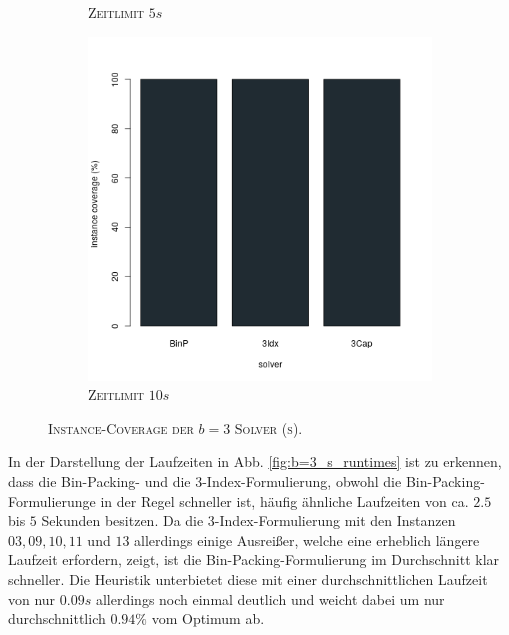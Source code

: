 \begin{figure}[H]
\begin{subfigure}[b]{0.3\textwidth}
\caption{\textsc{Zeitlimit} $5s$}
\label{fig:instance_coverage_b=3_s_b}
\end{subfigure}
\hfill
\begin{subfigure}[b]{0.3\textwidth}
\centering
\includegraphics[width=1.2\textwidth]{img/solver_instance_coverage_b=3_s_10s.png}
\caption{\textsc{Zeitlimit} $10s$}
\label{fig:instance_coverage_b=3_s_c}
\end{subfigure}

\caption{\textsc{Instance-Coverage der $b = 3$ Solver (s)}.}
\label{fig:instance_coverage_b=3_s}
\end{figure}

In der Darstellung der Laufzeiten in Abb. \ref{fig:b=3_s_runtimes} ist zu erkennen, dass die Bin-Packing-
und die 3-Index-Formulierung, obwohl die Bin-Packing-Formulierunge in der Regel schneller ist,
häufig ähnliche Laufzeiten von ca. $2.5$ bis $5$ Sekunden besitzen.
Da die 3-Index-Formulierung mit den Instanzen $03, 09, 10, 11$ und $13$ allerdings einige Ausreißer,
welche eine erheblich längere Laufzeit erfordern, zeigt, ist die Bin-Packing-Formulierung im Durchschnitt klar schneller.
Die Heuristik unterbietet diese mit einer durchschnittlichen Laufzeit von nur $0.09s$ allerdings noch einmal deutlich
und weicht dabei um nur durchschnittlich $0.94 \%$ vom Optimum ab.

\pagebreak


